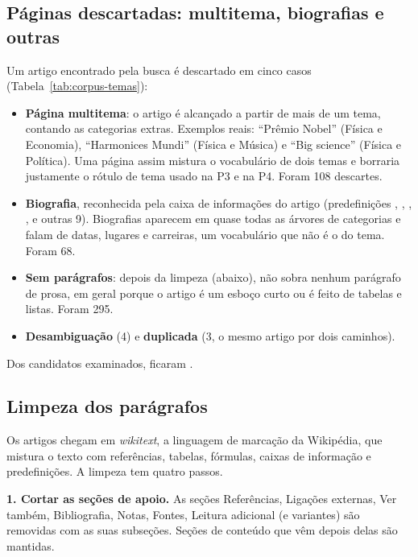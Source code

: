 \subsection{Páginas descartadas: multitema, biografias e outras}\label{sec:descartes}

Um artigo encontrado pela busca é descartado em cinco casos (Tabela~\ref{tab:corpus-temas}):
\begin{itemize}
    \item \textbf{Página multitema}: o artigo é alcançado a partir de mais de um tema,
    contando as categorias extras. Exemplos reais: ``Prêmio Nobel'' (Física e Economia),
    ``Harmonices Mundi'' (Física e Música) e ``Big science'' (Física e Política). Uma página
    assim mistura o vocabulário de dois temas e borraria justamente o rótulo de tema usado na
    P3 e na P4. Foram 108 descartes.
    \item \textbf{Biografia}, reconhecida pela caixa de informações do artigo (predefinições
    , , , ,
     e outras 9). Biografias aparecem em quase todas as árvores de
    categorias e falam de datas, lugares e carreiras, um vocabulário que não é o do tema.
    Foram 68.
    \item \textbf{Sem parágrafos}: depois da limpeza (abaixo), não sobra nenhum parágrafo de
    prosa, em geral porque o artigo é um esboço curto ou é feito de tabelas e listas. Foram
    295.
    \item \textbf{Desambiguação} (4) e \textbf{duplicada} (3, o mesmo artigo por dois
    caminhos).
\end{itemize}
Dos \nArtigosCandidatos{} candidatos examinados, ficaram \nArtigos{}.

\subsection{Limpeza dos parágrafos}\label{sec:limpeza}

Os artigos chegam em \emph{wikitext}, a linguagem de marcação da Wikipédia, que mistura o texto
com referências, tabelas, fórmulas, caixas de informação e predefinições. A limpeza tem
quatro passos.

\textbf{1. Cortar as seções de apoio.} As seções Referências, Ligações externas, Ver também,
Bibliografia, Notas, Fontes, Leitura adicional (e variantes) são removidas com as suas
subseções. Seções de conteúdo que vêm depois delas são mantidas.

